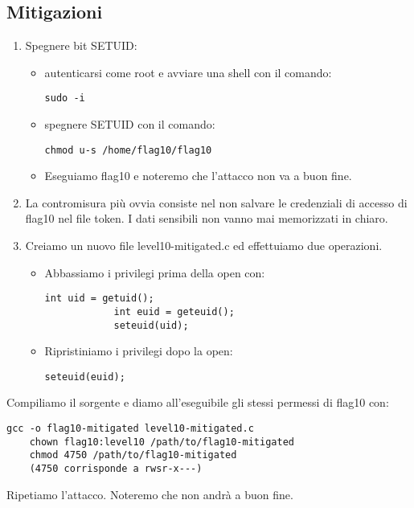 \subsection{Mitigazioni}
\begin{enumerate}
    \item Spegnere bit SETUID:
    \begin{itemize}
        \item autenticarsi come root e avviare una shell con il comando: \begin{lstlisting}[style=bashstyle] 
        sudo -i
        \end{lstlisting}
        \item spegnere SETUID con il comando: \begin{lstlisting}[style=bashstyle] 
        chmod u-s /home/flag10/flag10
        \end{lstlisting}   
        \item Eseguiamo flag10 e noteremo che l'attacco non va a buon fine. 
    \end{itemize}
    \item La contromisura più ovvia consiste nel non salvare le credenziali di accesso di flag10 nel file token. I dati sensibili non vanno mai memorizzati in chiaro.
    \item Creiamo un nuovo file level10-mitigated.c ed effettuiamo due operazioni.
    \begin{itemize}
        \item Abbassiamo i privilegi prima della open con:
        \begin{lstlisting}[style=cstyle]
            int uid = getuid();
            int euid = geteuid();
            seteuid(uid);
        \end{lstlisting}
        \item Ripristiniamo i privilegi dopo la open:
        \begin{lstlisting}[style=cstyle]
            seteuid(euid);
        \end{lstlisting}
    \end{itemize}
\end{enumerate}
Compiliamo il sorgente e diamo all'eseguibile gli stessi permessi di flag10 con:
\begin{lstlisting}[style=bashstyle]
    gcc -o flag10-mitigated level10-mitigated.c
    chown flag10:level10 /path/to/flag10-mitigated 
    chmod 4750 /path/to/flag10-mitigated
    (4750 corrisponde a rwsr-x---)
    \end{lstlisting}
Ripetiamo l'attacco. Noteremo che non andrà a buon fine.

